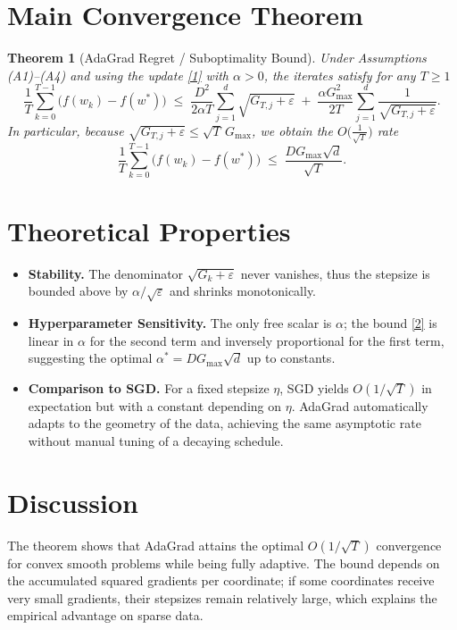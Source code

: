 \documentclass{article}
\newtheorem{theorem}{Theorem}
\begin{document}
\section*{Main Convergence Theorem}
\begin{theorem}[AdaGrad Regret / Suboptimality Bound]\label{thm:adagrad}
Under Assumptions (A1)–(A4) and using the update \eqref{1} with $\alpha>0$, the iterates satisfy for any $T\ge 1$
\[
\frac{1}{T}\sum_{k=0}^{T-1}\bigl(f(w_{k})-f(w^{*})\bigr)
   \;\le\;
   \frac{D^{2}}{2\alpha T}\sum_{j=1}^{d}\sqrt{G_{T,j}+\varepsilon}
   \;+\;
   \frac{\alpha G_{\max}^{2}}{2T}\sum_{j=1}^{d}\frac{1}{\sqrt{G_{T,j}+\varepsilon}} .
\tag{2}
\]
In particular, because $\sqrt{G_{T,j}+\varepsilon}\le\sqrt{T}\,G_{\max}$, we obtain the $O\!\bigl(\frac{1}{\sqrt{T}}\bigr)$ rate
\[
\frac{1}{T}\sum_{k=0}^{T-1}\bigl(f(w_{k})-f(w^{*})\bigr)
   \;\le\;
   \frac{D G_{\max}\sqrt{d}}{\sqrt{T}} .
\tag{3}
\]
\end{theorem}

\section*{Theoretical Properties}
\begin{itemize}
\item \textbf{Stability.} The denominator $\sqrt{G_{k}+\varepsilon}$ never vanishes, thus the stepsize is bounded above by $\alpha/\sqrt{\varepsilon}$ and shrinks monotonically.
\item \textbf{Hyperparameter Sensitivity.} The only free scalar is $\alpha$; the bound \eqref{2} is linear in $\alpha$ for the second term and inversely proportional for the first term, suggesting the optimal $\alpha^{*}=D G_{\max}\sqrt{d}$ up to constants.
\item \textbf{Comparison to SGD.} For a fixed stepsize $\eta$, SGD yields $O(1/\sqrt{T})$ in expectation but with a constant depending on $\eta$. AdaGrad automatically adapts to the geometry of the data, achieving the same asymptotic rate without manual tuning of a decaying schedule.
\end{itemize}

\section*{Discussion}
The theorem shows that AdaGrad attains the optimal $O(1/\sqrt{T})$ convergence for convex smooth problems while being fully adaptive. The bound depends on the accumulated squared gradients per coordinate; if some coordinates receive very small gradients, their stepsizes remain relatively large, which explains the empirical advantage on sparse data.
\end{document}
